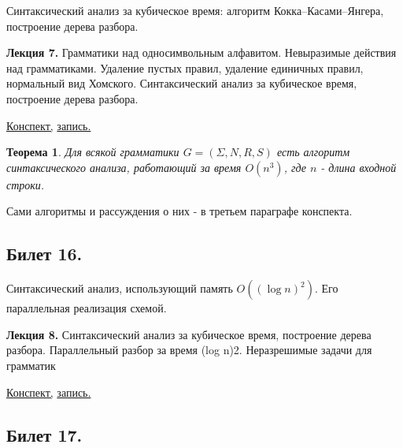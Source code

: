 \documentclass[a4paper]{article}
\newcommand{\mybox}{%
    \collectbox{%
        \setlength{\fboxsep}{1pt}%
        \fbox{\BOXCONTENT}%
    }%
}
\theoremstyle{indented}
\newtheorem{theorem}{Теорема}
\theoremstyle{definition}
\theoremstyle{remark}
\begin{document}
Синтаксический анализ за кубическое время: алгоритм Кокка–Касами–Янгера, построение дерева разбора.

\hrulefill

\textbf{Лекция 7.} Грамматики над односимвольным алфавитом. Невыразимые действия над грамматиками. Удаление пустых правил, удаление единичных правил, нормальный вид Хомского. Синтаксический анализ за кубическое время, построение дерева разбора.

\begin{flushright}
    \mybox{
        \href{https://users.math-cs.spbu.ru/~okhotin/teaching/tcs_fl_2021/okhotin_tcs_fl_2021_l7.pdf}{Конспект,}
        \href{https://disk.yandex.ru/d/knoQ44wLmGDwwQ/2021-2022%20учебный%20год%20(осенний%20семестр)/2%20курс/Теоретическая%20информатика/M2021-10-13_111709_1h40m_102.mp4}{запись.}
    }
\end{flushright}

\begin{theorem}
    Для всякой грамматики $G = (\Sigma,N,R,S)$ есть алгоритм синтаксического анализа, работающий за время $O(n^3)$, где $n$ - длина входной строки.
\end{theorem}

Сами алгоритмы и рассуждения о них - в третьем параграфе конспекта.



\newpage 

\subsection{Билет 16.}

Синтаксический анализ, использующий память $O((\log n)^2)$. Его параллельная реализация схемой.

\hrulefill

\textbf{Лекция 8.} Синтаксический анализ за кубическое время, построение дерева разбора. Параллельный разбор за время (log n)2. Неразрешимые задачи для грамматик

\begin{flushright}
    \mybox{
        \href{https://users.math-cs.spbu.ru/~okhotin/teaching/tcs_fl_2021/okhotin_tcs_fl_2021_l8.pdf}{Конспект,}
        \href{https://disk.yandex.ru/d/knoQ44wLmGDwwQ/2021-2022%20учебный%20год%20(осенний%20семестр)/2%20курс/Теоретическая%20информатика/M2021-10-20_111602_1m_102.mp4}{запись.}
    }
\end{flushright}

\subsection{Билет 17.}
\end{document}

